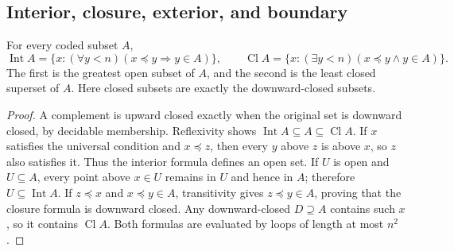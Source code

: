 \subsection{Interior, closure, exterior, and boundary}

\begin{theorem}\label{thm:finite-intcl}
For every coded subset $A$,
\[
 \operatorname{Int}A=\{x:(\forall y<n)(x\preceq y\Rightarrow y\in A)\},
 \qquad
 \operatorname{Cl}A=\{x:(\exists y<n)(x\preceq y\land y\in A)\}.
\]
The first is the greatest open subset of $A$, and the second is the
least closed superset of $A$.  Here closed subsets are exactly the
downward-closed subsets.
\end{theorem}
\begin{proof}
A complement is upward closed exactly when the original set is
downward closed, by decidable membership.  Reflexivity shows
$\operatorname{Int}A\subseteq A\subseteq\operatorname{Cl}A$.
If $x$ satisfies the universal condition and $x\preceq z$, then
every $y$ above $z$ is above $x$, so $z$ also satisfies it.  Thus the
interior formula defines an open set.  If $U$ is open and
$U\subseteq A$, every point above $x\in U$ remains in $U$ and hence
in $A$; therefore $U\subseteq\operatorname{Int}A$.
If $z\preceq x$ and $x\preceq y\in A$, transitivity gives
$z\preceq y\in A$, proving that the closure formula is downward
closed.  Any downward-closed $D\supseteq A$ contains such $x$, so it
contains $\operatorname{Cl}A$.  Both formulas are evaluated by loops
of length at most $n^2$.
\end{proof}


